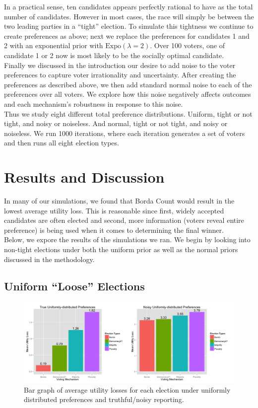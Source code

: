 \documentclass[11pt]{scrartcl}
\newcommand{\Expo}{\textrm{Expo}}
\begin{document}
In a practical sense, ten candidates appears perfectly rational to have as the total number of candidates. However in most cases, the race will simply be between the two leading parties in a ``tight'' election. To simulate this tightness we continue to create preferences as above; next we replace the preferences for candidates 1 and 2 with an exponential prior with $\Expo(\lambda = 2)$. Over 100 voters, one of candidate 1 or 2 now is most likely to be the socially optimal candidate.\\

Finally we discussed in the introduction our desire to add noise to the voter preferences to capture voter irrationality and uncertainty. After creating the preferences as described above, we then add standard normal noise to each of the preferences over all voters. We explore how this noise negatively affects outcomes and each mechanism's robustness in response to this noise.\\

Thus we study eight different total preference distributions. Uniform, tight or not tight, and noisy or noiseless. And normal, tight or not tight, and noisy or noiseless. We run 1000 iterations, where each iteration generates a set of voters and then runs all eight election types.

\section{Results and Discussion}

In many of our simulations, we found that Borda Count would result in the lowest average utility loss. This is reasonable since first, widely accepted candidates are often elected and second, more information (voters reveal entire preference) is being used when it comes to determining the final winner.\\  

Below, we expore the results of the simulations we ran. We begin by looking into non-tight elections under both the uniform prior as well as the normal priors discussed in the methodology.

\subsection{Uniform ``Loose'' Elections}
\begin{figure}[H]\center
\includegraphics[scale=0.38]{uniform.png}
\caption{Bar graph of average utility losses for each election under uniformly distributed preferences and truthful/noisy reporting.}
\end{figure}
\end{document}
